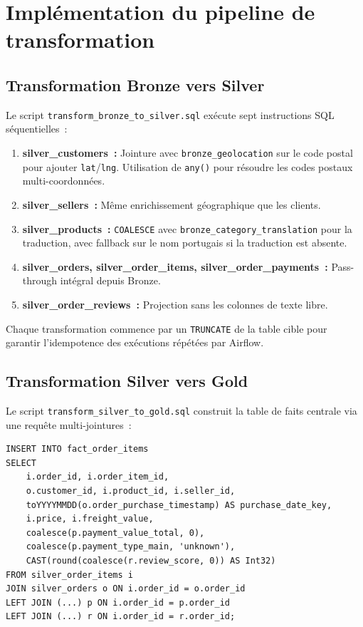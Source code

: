 \section{Implémentation du pipeline de transformation}

\subsection{Transformation Bronze vers Silver}

Le script \texttt{transform\_bronze\_to\_silver.sql} exécute sept instructions SQL séquentielles~:

\begin{enumerate}
  \setlength{\itemsep}{0.3em}
  \item \textbf{silver\_customers~:} Jointure avec \texttt{bronze\_geolocation} sur le code postal pour ajouter \texttt{lat}/\texttt{lng}. Utilisation de \texttt{any()} pour résoudre les codes postaux multi-coordonnées.
  \item \textbf{silver\_sellers~:} Même enrichissement géographique que les clients.
  \item \textbf{silver\_products~:} \texttt{COALESCE} avec \texttt{bronze\_category\_translation} pour la traduction, avec fallback sur le nom portugais si la traduction est absente.
  \item \textbf{silver\_orders, silver\_order\_items, silver\_order\_payments~:} Pass-through intégral depuis Bronze.
  \item \textbf{silver\_order\_reviews~:} Projection sans les colonnes de texte libre.
\end{enumerate}

Chaque transformation commence par un \texttt{TRUNCATE} de la table cible pour garantir l'idempotence des exécutions répétées par Airflow.

\subsection{Transformation Silver vers Gold}

Le script \texttt{transform\_silver\_to\_gold.sql} construit la table de faits centrale via une requête multi-jointures~:

\begin{verbatim}
INSERT INTO fact_order_items
SELECT
    i.order_id, i.order_item_id,
    o.customer_id, i.product_id, i.seller_id,
    toYYYYMMDD(o.order_purchase_timestamp) AS purchase_date_key,
    i.price, i.freight_value,
    coalesce(p.payment_value_total, 0),
    coalesce(p.payment_type_main, 'unknown'),
    CAST(round(coalesce(r.review_score, 0)) AS Int32)
FROM silver_order_items i
JOIN silver_orders o ON i.order_id = o.order_id
LEFT JOIN (...) p ON i.order_id = p.order_id
LEFT JOIN (...) r ON i.order_id = r.order_id;
\end{verbatim}

